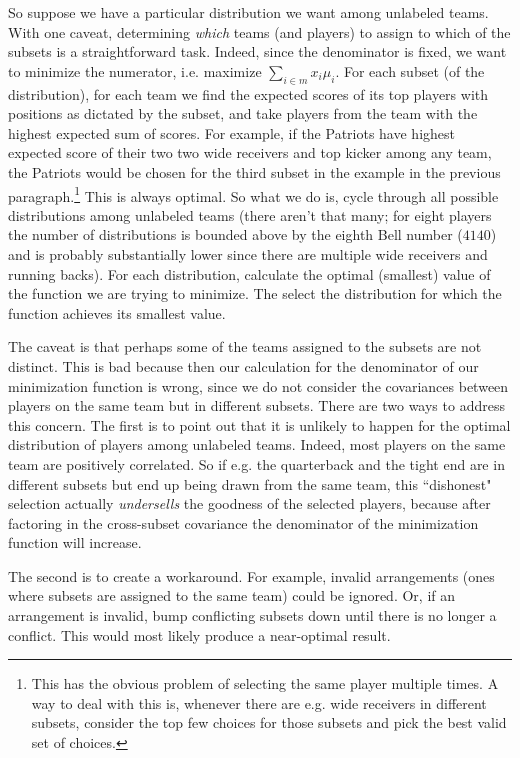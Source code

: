 \documentclass[12pt, final, onecolumn, titlepage]{article}
\theoremstyle{definition}
\begin{document}
So suppose we have a particular distribution we want among unlabeled teams. With one caveat, determining \emph{which} teams (and players) to assign to which of the subsets is a straightforward task. Indeed, since the denominator is fixed, we want to minimize the numerator, i.e. maximize $\sum_{i \in m} x_i\mu_i$. For each subset (of the distribution), for each team we find the expected scores of its top players with positions as dictated by the subset, and take players from the team with the highest expected sum of scores. For example, if the Patriots have highest expected score of their two two wide receivers and top kicker among any team, the Patriots would be chosen for the third subset in the example in the previous paragraph.\footnote{This has the obvious problem of selecting the same player multiple times. A way to deal with this is, whenever there are e.g. wide receivers in different subsets, consider the top few choices for those subsets and pick the best valid set of choices.} This is always optimal. So what we do is, cycle through all possible distributions among unlabeled teams (there aren't that many; for eight players the number of distributions is bounded above by the eighth Bell number ($4140$) and is probably substantially lower since there are multiple wide receivers and running backs). For each distribution, calculate the optimal (smallest) value of the function we are trying to minimize. The select the distribution for which the function achieves its smallest value.

The caveat is that perhaps some of the teams assigned to the subsets are not distinct. This is bad because then our calculation for the denominator of our minimization function is wrong, since we do not consider the covariances between players on the same team but in different subsets. There are two ways to address this concern. The first is to point out that it is unlikely to happen for the optimal distribution of players among unlabeled teams. Indeed, most players on the same team are positively correlated. So if e.g. the quarterback and the tight end are in different subsets but end up being drawn from the same team, this ``dishonest" selection actually \emph{undersells} the goodness of the selected players, because after factoring in the cross-subset covariance the denominator of the minimization function will increase.

The second is to create a workaround. For example, invalid arrangements (ones where subsets are assigned to the same team) could be ignored. Or, if an arrangement is invalid, bump conflicting subsets down until there is no longer a conflict. This would most likely produce a near-optimal result.
\end{document}
